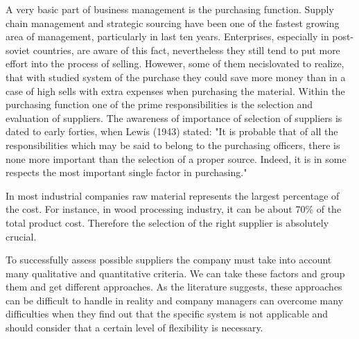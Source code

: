 \documentclass[oneside,12pt]{article}%
\begin{document}
\newpage




\obsah


\setcounter{page}{7}

A very basic part of business management is the purchasing function. Supply chain management and strategic sourcing have been one of the fastest growing area of management, particularly in last ten years. Enterprises, especially in post-soviet countries, are aware of this fact, nevertheless they still tend to put more effort into the process of selling. Howewer, some of them necislovated to realize, that with studied system of the purchase they could save more money than in a case of high sells with extra expenses when purchasing the material. Within the purchasing function one of the prime responsibilities is the selection and evaluation of suppliers. The awareness of importance of selection of suppliers is dated to early forties, when Lewis (1943) stated: "It is probable that of all the responsibilities which may be said to belong to the purchasing officers, there is none more important than the selection of a proper source. Indeed, it is in some respects the most important single factor in purchasing." \par
In most industrial companies raw material represents the largest percentage of the cost. For instance, in wood processing industry, it can be about 70\% of the total product cost. Therefore the selection of the right supplier is absolutely crucial.\par
To successfully assess possible suppliers the company must take into account many qualitative and quantitative criteria. We can take these factors and group them and get different approaches. As the literature suggests, these approaches can be difficult to handle in reality and company managers can overcome many difficulties when they find out that the specific system is not applicable and should consider that a certain level of flexibility is necessary.
\end{document}

